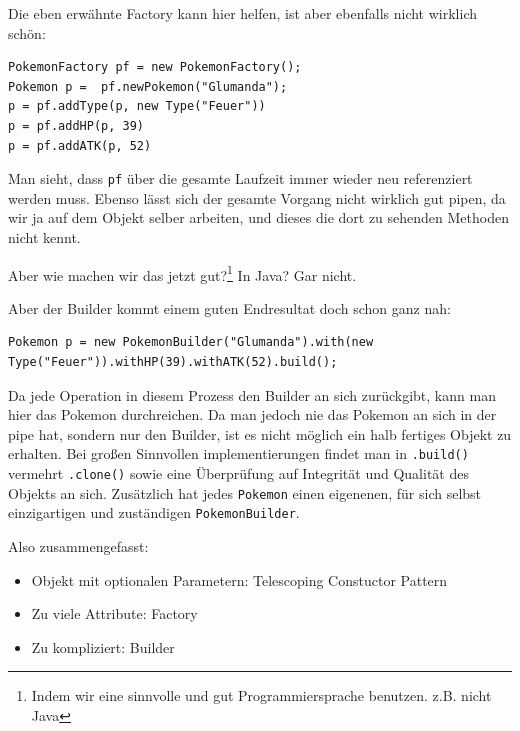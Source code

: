 \documentclass{article}
\newcommand{\gqq}[1]{\glqq{}#1\grqq{}}
\begin{document}
\begin{enumerate}[label=\alph*.]
            Die eben erwähnte Factory kann hier helfen, ist aber ebenfalls nicht wirklich schön:

            \begin{verbatim}
PokemonFactory pf = new PokemonFactory();
Pokemon p =  pf.newPokemon("Glumanda");
p = pf.addType(p, new Type("Feuer"))
p = pf.addHP(p, 39)
p = pf.addATK(p, 52)
            \end{verbatim}

            Man sieht, dass \texttt{pf} über die gesamte Laufzeit immer wieder neu referenziert werden muss.
            Ebenso lässt sich der gesamte Vorgang nicht wirklich gut pipen, da wir ja auf dem Objekt selber arbeiten, und dieses die dort zu sehenden Methoden nicht kennt.

            Aber wie machen wir das jetzt gut?\footnote{Indem wir eine sinnvolle und gut Programmiersprache benutzen. z.B. nicht Java}
            In Java? Gar nicht.
            
            Aber der Builder kommt einem guten Endresultat doch schon ganz nah:

            \begin{verbatim}
Pokemon p = new PokemonBuilder("Glumanda").with(new Type("Feuer")).withHP(39).withATK(52).build();
            \end{verbatim}

            Da jede Operation in diesem Prozess den Builder an sich zurückgibt, kann man hier das Pokemon \gqq{durchreichen}.
            Da man jedoch nie das Pokemon an sich in der pipe hat, sondern nur den Builder, ist es nicht möglich ein halb fertiges Objekt zu erhalten.
            Bei großen Sinnvollen implementierungen findet man in \texttt{.build()} vermehrt \texttt{.clone()} sowie eine Überprüfung auf Integrität und Qualität des Objekts an sich.
            Zusätzlich hat jedes \texttt{Pokemon} einen eigenenen, für sich selbst einzigartigen und zuständigen \texttt{PokemonBuilder}.

            Also zusammengefasst:
            \begin{itemize}
                \renewcommand\labelitemi{$\rightarrow$}
                \item Objekt mit optionalen Parametern: Telescoping Constuctor Pattern
                \item Zu viele Attribute: Factory
                \item Zu kompliziert: Builder
            \end{itemize}


\end{enumerate}
\end{document}
